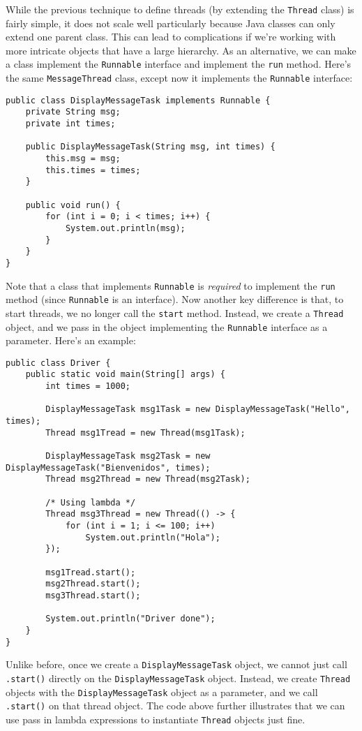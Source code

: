 While the previous technique to define threads (by extending the \verb!Thread! class) is fairly simple, it does not scale well particularly because Java classes can only extend one parent class. This can lead to complications if we're working with more intricate objects that have a large hierarchy. As an alternative, we can make a class implement the \verb!Runnable! interface and implement the \verb!run! method. Here's the same \verb!MessageThread! class, except now it implements the \verb!Runnable! interface:

\begin{lstlisting}
public class DisplayMessageTask implements Runnable {
	private String msg;
	private int times;

	public DisplayMessageTask(String msg, int times) {
		this.msg = msg;
		this.times = times;
	}

	public void run() {
		for (int i = 0; i < times; i++) {
			System.out.println(msg);
		}
	}
}
\end{lstlisting}

Note that a class that implements \verb!Runnable! is \textit{required} to implement the \verb!run! method (since \verb!Runnable! is an interface). Now another key difference is that, to start threads, we no longer call the \verb!start! method. Instead, we create a \verb!Thread! object, and we pass in the object implementing the \verb!Runnable! interface as a parameter. Here's an example:

\begin{lstlisting}
public class Driver {
	public static void main(String[] args) {
		int times = 1000;

		DisplayMessageTask msg1Task = new DisplayMessageTask("Hello", times);
		Thread msg1Tread = new Thread(msg1Task);

		DisplayMessageTask msg2Task = new DisplayMessageTask("Bienvenidos", times);
		Thread msg2Thread = new Thread(msg2Task);

		/* Using lambda */
		Thread msg3Thread = new Thread(() -> {
			for (int i = 1; i <= 100; i++)
				System.out.println("Hola");
		});
		
		msg1Tread.start();
		msg2Thread.start();
		msg3Thread.start();

		System.out.println("Driver done");
	}
}
\end{lstlisting}

Unlike before, once we create a \verb!DisplayMessageTask! object, we cannot just call \verb!.start()! directly on the \verb!DisplayMessageTask! object. Instead, we create \verb!Thread! objects with the \verb!DisplayMessageTask! object as a parameter, and we call \verb!.start()! on that thread object. The code above further illustrates that we can use pass in lambda expressions to instantiate \verb!Thread! objects just fine. 

